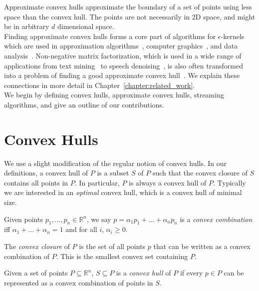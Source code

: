 Approximate convex hulls approximate the boundary of a set of points using less space than the convex hull. The points are not necessarily in 2D space, and might be in arbitrary $d$ dimensional space.
\\

Finding approximate convex hulls forms a core part of algorithms for $\epsilon$-kernels~\cite{survey} which are used in approximation algorithms~\cite{Agarwal:2004:AEM:1008731.1008736}, computer graphics~\cite{BAREQUET200191}, and data analysis~\cite{DBLP:journals/corr/AgarwalKSS17}. Non-negative matrix factorization, which is used in a wide range of applications from text mining~\cite{Berry2005} to speech denoising~\cite{schmidt-noise}, is also often transformed into a problem of finding a good approximate convex hull~\cite{Arora:2012:CNM:2213977.2213994}. We explain these connections in more detail in Chapter~\ref{chapter:related_work}.
\\

We begin by defining convex hulls, approximate convex hulls, streaming algorithms, and give an outline of our contributions.

\section{Convex Hulls}

We use a slight modification of the regular notion of convex hulls. In our definitions, a convex hull of $P$ is a subset $S$ of $P$ such that the convex closure of $S$ contains all points in $P$. In particular, $P$ is always a convex hull of $P$. Typically we are interested in an \emph{optimal} convex hull, which is a convex hull of minimal size.
\\

\begin{definition}
Given points $p_1, ..., p_n \in \mathbb{R}^n$, we say $p = \alpha_1 p_1 + ... + \alpha_n p_n$ is a \emph{convex combination} iff $\alpha_1 + ... + \alpha_n = 1$ and for all $i$, $\alpha_i \geq 0$.
\end{definition}

\begin{definition}
The \emph{convex closure} of $P$ is the set of all points $p$ that can be written as a convex combination of $P$. This is the smallest convex set containing $P$.
\end{definition}

\begin{definition}
Given a set of points $P \subseteq \mathbb{R}^n$, $S \subseteq P$ is a \emph{convex hull} of $P$ if every $p \in P$ can be represented as a convex combination of points in $S$.
\end{definition}

